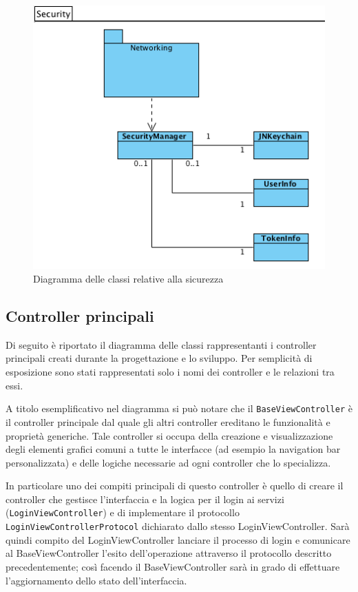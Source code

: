 \begin{figure}[!htbp]
\centering
\includegraphics[scale=0.70]{architettura/securityClass.png}
\caption{Diagramma delle classi relative alla sicurezza}
\end{figure}

\subsection{Controller principali}
Di seguito è riportato il diagramma delle classi rappresentanti i controller principali creati durante la progettazione e lo sviluppo. Per semplicità di esposizione sono stati rappresentati solo i nomi dei controller e le relazioni tra essi.
\newline

A titolo esemplificativo nel diagramma si può notare che il \texttt{BaseViewController} è il controller principale dal quale gli altri controller ereditano le funzionalità e proprietà generiche. Tale controller si occupa della creazione e visualizzazione degli  elementi grafici comuni a tutte le interfacce (ad esempio la navigation bar personalizzata) e delle logiche necessarie ad ogni controller che lo specializza.

In particolare uno dei compiti principali di questo controller è quello di creare il controller che gestisce l'interfaccia e la logica per il login ai servizi (\texttt{LoginViewController}) e di implementare il protocollo \texttt{LoginViewControllerProtocol} dichiarato dallo stesso LoginViewController. Sarà quindi compito del LoginViewController  lanciare il processo di login e comunicare al BaseViewController l'esito dell'operazione attraverso il protocollo descritto precedentemente; così facendo il BaseViewController sarà in grado di effettuare l'aggiornamento dello stato dell'interfaccia.


